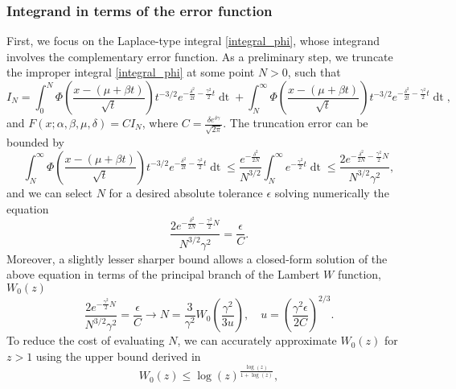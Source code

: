 \documentclass[10pt,a4paper,oneside]{article}
\numberwithin{equation}{section}
\begin{document}
\subsubsection{Integrand in terms of the error function}
First, we focus on the Laplace-type integral \eqref{integral_phi}, whose integrand involves the complementary error function.
As a preliminary step, we truncate the improper integral \eqref{integral_phi} at some point $N > 0$, such that
\begin{equation}\label{truncated_integral}
I_N = \int_0^N \Phi\left(\frac{x - (\mu +\beta t)}{\sqrt{t}}\right) t^{-3/2} e^{-\frac{\delta^2}{2t} - \frac{\gamma^2}{2}t} \mathop{dt} + \int_N^{\infty} \Phi\left(\frac{x - (\mu +\beta t)}{\sqrt{t}}\right) t^{-3/2} e^{-\frac{\delta^2}{2t} - \frac{\gamma^2}{2}t} \mathop{dt},
\end{equation}
and $F(x; \alpha, \beta, \mu, \delta) = C I_N$, where $C = \frac{\delta e^{\delta \gamma}}{\sqrt{2\pi}}$. The truncation error can be bounded by
\begin{equation}
\int_N^{\infty} \Phi\left(\frac{x - (\mu +\beta t)}{\sqrt{t}}\right) t^{-3/2} e^{-\frac{\delta^2}{2t} - \frac{\gamma^2}{2}t} \mathop{dt} \le \frac{e^{-\frac{\delta^2}{2N}}}{N^{3/2}}\int_N^{\infty} e^{- \frac{\gamma^2}{2}t} \mathop{dt} \le \frac{2 e^{-\frac{\delta^2}{2N} - \frac{\gamma^2}{2}N}}{N^{3/2} \gamma^2},
\end{equation}
and we can select $N$ for a desired absolute tolerance $\epsilon$ solving numerically the equation
\begin{equation}
\frac{2 e^{-\frac{\delta^2}{2N} - \frac{\gamma^2}{2}N}}{N^{3/2} \gamma^2} = \frac{\epsilon}{C}.
\end{equation}
Moreover, a slightly lesser sharper bound allows a closed-form solution of the above equation in terms of the principal branch of the Lambert $W$ function, $W_0(z)$
\begin{equation}\label{N_equation}
\frac{2 e^{- \frac{\gamma^2}{2}N}}{N^{3/2} \gamma^2} = \frac{\epsilon}{C} \longrightarrow N = \frac{3}{\gamma^2}W_0\left(\frac{\gamma^2}{3u}\right), \quad u = \left(\frac{\gamma^2 \epsilon}{2 C}\right)^{2/3}.
\end{equation}
To reduce the cost of evaluating $N$, we can accurately approximate $W_0(z)$ for $z > 1$ using the upper bound derived in \cite{Hoorfar2008}
\begin{equation}\label{lambertW0_upper_bound}
W_0(z) \le \log(z)^{\tfrac{\log(z)}{1 + \log(z)}},
\end{equation}
\end{document}
